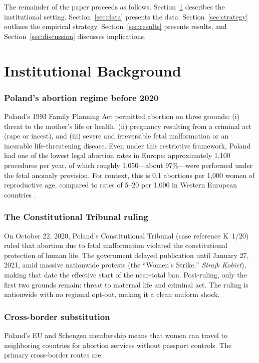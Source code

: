 \documentclass[12pt]{article}
\begin{document}
The remainder of the paper proceeds as follows. Section~\ref{sec:background} describes the institutional setting. Section~\ref{sec:data} presents the data. Section~\ref{sec:strategy} outlines the empirical strategy. Section~\ref{sec:results} presents results, and Section~\ref{sec:discussion} discusses implications.


\section{Institutional Background}
\label{sec:background}

\subsubsection*{Poland's abortion regime before 2020} Poland's 1993 Family Planning Act permitted abortion on three grounds: (i) threat to the mother's life or health, (ii) pregnancy resulting from a criminal act (rape or incest), and (iii) severe and irreversible fetal malformation or an incurable life-threatening disease. Even under this restrictive framework, Poland had one of the lowest legal abortion rates in Europe: approximately 1,100 procedures per year, of which roughly 1,050---about 97\%---were performed under the fetal anomaly provision. For context, this is 0.1 abortions per 1,000 women of reproductive age, compared to rates of 5--20 per 1,000 in Western European countries \citep{sedgh2016}.

\subsubsection*{The Constitutional Tribunal ruling} On October 22, 2020, Poland's Constitutional Tribunal (case reference K~1/20) ruled that abortion due to fetal malformation violated the constitutional protection of human life. The government delayed publication until January 27, 2021, amid massive nationwide protests (the ``Women's Strike,'' \textit{Strajk Kobiet}), making that date the effective start of the near-total ban. Post-ruling, only the first two grounds remain: threat to maternal life and criminal act. The ruling is nationwide with no regional opt-out, making it a clean uniform shock.

\subsubsection*{Cross-border substitution} Poland's EU and Schengen membership means that women can travel to neighboring countries for abortion services without passport controls. The primary cross-border routes are:
\end{document}
